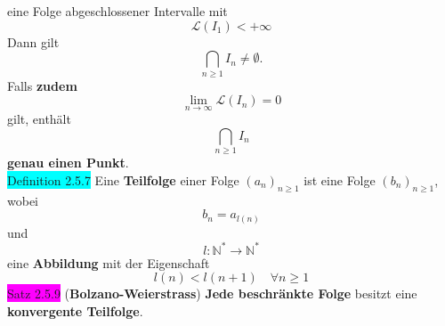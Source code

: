 \documentclass[landscape, 10pt]{article}
\newcommand{\N}{\mathbb{N}}
\begin{document}
\begin{multicols}{3}
                     eine Folge 
                     abgeschlossener Intervalle mit 
                     \begin{equation*}
                            \mathcal{L}(I_1)<+\infty
                     \end{equation*}
                     Dann gilt 
                     \begin{equation*}
                            \bigcap_{n\geqslant1}I_n\neq\emptyset.
                     \end{equation*}
                     Falls \textbf{zudem}  
                     \begin{equation*}
                            \lim\limits_{n\to\infty}\mathcal{L}(I_n)=0
                     \end{equation*} 
                     gilt, enthält 
                     \begin{equation*}
                            \bigcap_{n\geqslant1}I_n
                     \end{equation*}
                     \textbf{genau einen Punkt}.\\
              \colorbox{cyan}{Definition 2.5.7} 
                     Eine \textbf{Teilfolge} einer Folge 
                     \textcolor{NavyBlue}{$(a_n)_{n\geqslant1}$}
                     ist eine Folge 
                     \textcolor{NavyBlue}{$(b_n)_{n\geqslant1}$}, 
                     wobei 
                     \begin{equation*}
                            b_n=a_{l(n)}
                     \end{equation*}
                     und 
                     \begin{equation*}
                            l:\N^{*}\longrightarrow\N^*
                     \end{equation*}
                     eine \textbf{Abbildung} mit der Eigenschaft 
                     \begin{equation*}
                            l(n)<l(n+1)\quad\forall n\geqslant1
                     \end{equation*}
              \colorbox{magenta}{Satz 2.5.9} 
              (\textbf{Bolzano-Weierstrass}) 
                     \textbf{Jede beschränkte Folge} 
                     besitzt eine \textbf{konvergente Teilfolge}.

\end{multicols}
\end{document}
